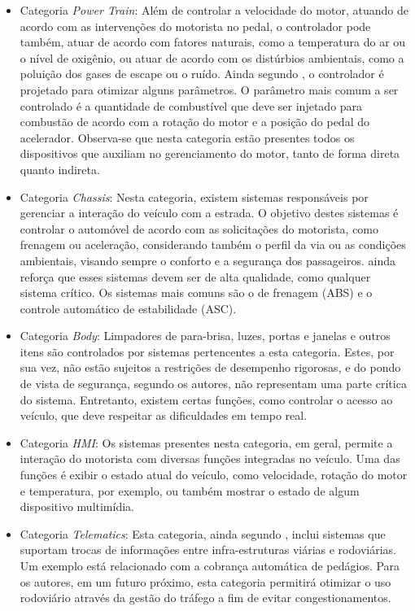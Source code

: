 \begin{itemize}
\item{Categoria \textit{Power Train}:}
Além de controlar a velocidade do motor, atuando de acordo com as intervenções do motorista no pedal, o controlador pode também, atuar de acordo com fatores naturais, como a temperatura do ar ou o nível de oxigênio, ou atuar de acordo com os distúrbios ambientais, como a poluição dos gases de escape ou o ruído. Ainda segundo , o controlador é projetado para otimizar alguns parâmetros. O parâmetro mais comum a ser controlado é a quantidade de combustível que deve ser injetado para combustão de acordo com a rotação do motor e a posição do pedal do acelerador. Observa-se que nesta categoria estão presentes todos os dispositivos que auxiliam no gerenciamento do motor, tanto de forma direta quanto indireta.

\item{Categoria \textit{Chassis}:}
Nesta categoria, existem sistemas responsáveis por gerenciar a interação do veículo com a estrada. O objetivo destes sistemas é controlar o automóvel de acordo com as solicitações do motorista, como frenagem ou aceleração, considerando também o perfil da via ou as condições ambientais, visando sempre o conforto e a segurança dos passageiros.  ainda reforça que esses sistemas devem ser de alta qualidade, como qualquer sistema crítico. Os sistemas mais comuns são o de frenagem (ABS) e o controle automático de estabilidade (ASC).

\item{Categoria \textit{Body}:}
Limpadores de para-brisa, luzes, portas e janelas e outros itens são controlados por sistemas pertencentes a esta categoria. Estes, por sua vez, não estão sujeitos a restrições de desempenho rigorosas, e do pondo de vista de segurança, segundo os autores, não representam uma parte crítica do sistema. Entretanto, existem certas funções, como controlar o acesso ao veículo, que deve respeitar as dificuldades em tempo real.

\item{Categoria \textit{HMI}:}
Os sistemas presentes nesta categoria, em geral, permite a interação do motorista com diversas funções integradas no veículo. Uma das funções é exibir o estado atual do veículo, como velocidade, rotação do motor e temperatura, por exemplo, ou também mostrar o estado de algum dispositivo multimídia.

\item{Categoria \textit{Telematics}:}
Esta categoria, ainda segundo , inclui sistemas que suportam trocas de informações entre infra-estruturas viárias e rodoviárias. Um exemplo está relacionado com a cobrança automática de pedágios. Para os autores, em um futuro próximo, esta categoria permitirá otimizar o uso rodoviário através da gestão do tráfego a fim de evitar congestionamentos.
\end{itemize}


